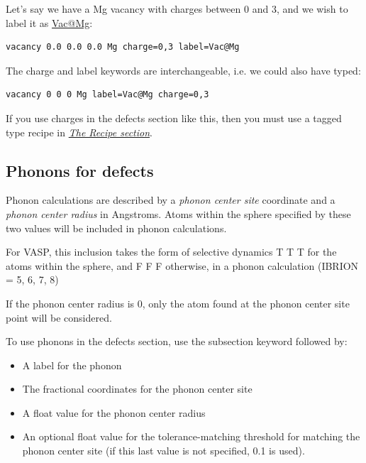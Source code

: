 \documentclass[letterpaper,10pt,english]{sphinxmanual}
\begin{document}
Let's say we have a Mg vacancy with charges between 0 and 3, and we wish to label it as \href{mailto:Vac@Mg}{Vac@Mg}:

\begin{Verbatim}[commandchars=\\\{\}]
vacancy 0.0 0.0 0.0 Mg charge=0,3 label=Vac@Mg
\end{Verbatim}

The charge and label keywords are interchangeable, i.e. we could also have typed:

\begin{Verbatim}[commandchars=\\\{\}]
vacancy 0 0 0 Mg label=Vac@Mg charge=0,3
\end{Verbatim}

If you use charges in the defects section like this, then you must use a tagged  type recipe in {\hyperref[3_1_3_recipe::doc]{\emph{The Recipe section}}}.


\subsection{Phonons for defects}
\label{3_1_5_defects:phonons-for-defects}
Phonon calculations are described by a \emph{phonon center site} coordinate and a \emph{phonon center radius} in Angstroms. Atoms within the sphere specified by these two values will be included in phonon calculations.

For VASP, this inclusion takes the form of selective dynamics T T T for the atoms within the sphere, and F F F otherwise, in a phonon calculation (IBRION = 5, 6, 7, 8)

If the phonon center radius is 0, only the atom found at the phonon center site point will be considered.

To use phonons in the defects section, use the subsection keyword  followed by:
\begin{itemize}
\item {} 
A label for the phonon

\item {} 
The fractional coordinates for the phonon center site

\item {} 
A float value for the phonon center radius

\item {} 
An optional float value for the tolerance-matching threshold for matching the phonon center site (if this last value is not specified, 0.1 is used).

\end{itemize}
\end{document}
